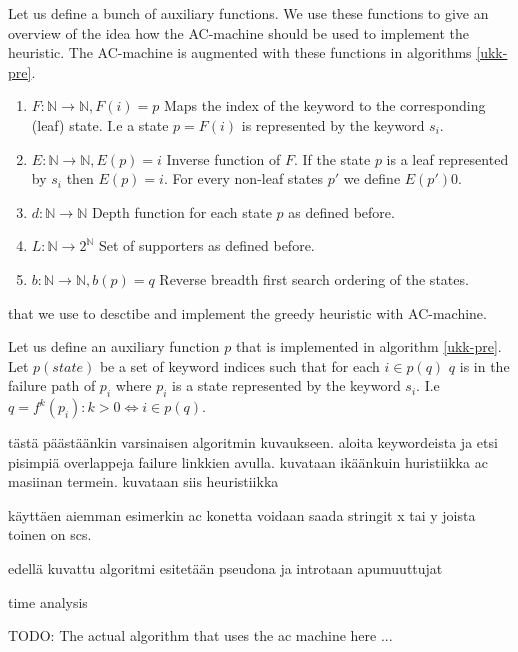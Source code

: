 \documentclass[english,twoside,censored,csm,algorithms-track-2020]{HYthesisML}
\theoremstyle{plain}
\theoremstyle{definition}
\begin{document}

Let us define a bunch of auxiliary functions. We use these functions to give an overview of the
idea how the AC-machine should be used to implement the heuristic. The AC-machine is augmented with
these functions in algorithms \ref{ukk-pre}.

\begin{enumerate}
  \item $F : \mathbb{N} \rightarrow \mathbb{N}, F(i)=p$ Maps the index of the keyword to the corresponding (leaf) state. I.e a state $p=F(i)$ is represented by the keyword $s_i$.
  \item $E : \mathbb{N} \rightarrow \mathbb{N}, E(p)=i$ Inverse function of $F$. If the state $p$ is a leaf represented by $s_i$ then $E(p)=i$. For every non-leaf states $p'$ we define $E(p') 0$.
  \item $d : \mathbb{N} \rightarrow \mathbb{N}$ Depth function for each state $p$ as defined before.
  \item $L : \mathbb{N} \rightarrow 2^{\mathbb{N}}$ Set of supporters as defined before.
  \item $b : \mathbb{N} \rightarrow \mathbb{N}, b(p)=q$ Reverse breadth first search ordering of the states.
\end{enumerate}



that we use to desctibe and implement the greedy
heuristic with AC-machine. 

Let us define an auxiliary function
$p$ that is implemented in algorithm \ref{ukk-pre}. Let $p(state)$ be a set of keyword indices
such that for each $i\in p(q)$ $q$ is in the failure path of $p_i$ where $p_i$ is a state
represented by the keyword $s_i$. I.e $q = f^k(p_i) : k>0 \iff i\in p(q)$.


tästä päästäänkin varsinaisen algoritmin kuvaukseen. aloita keywordeista ja etsi pisimpiä
overlappeja failure linkkien avulla. kuvataan ikäänkuin huristiikka ac masiinan termein.
kuvataan siis heuristiikka

käyttäen aiemman esimerkin ac konetta voidaan saada stringit x tai y joista toinen on scs.

edellä kuvattu algoritmi esitetään pseudona ja introtaan apumuuttujat

time analysis



TODO: The actual algorithm that uses the ac machine here ...
\end{document}

